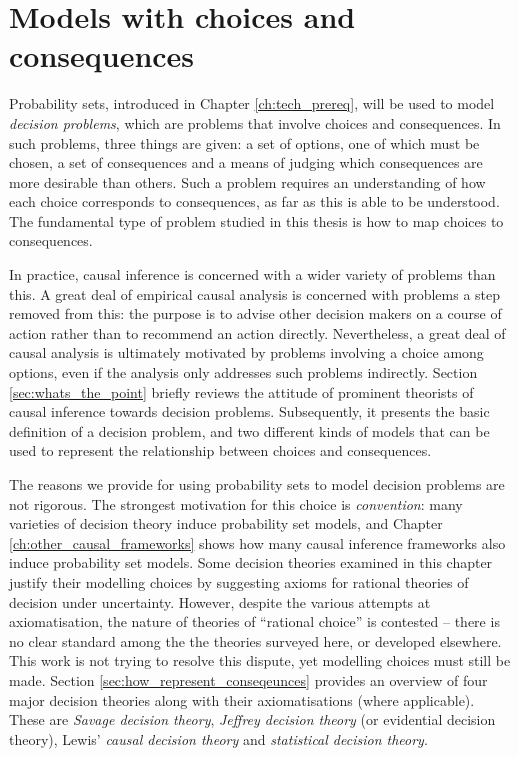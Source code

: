 

\chapter{Models with choices and consequences}\label{ch:2p_statmodels}

Probability sets, introduced in Chapter \ref{ch:tech_prereq}, will be used to model \emph{decision problems}, which are problems that involve choices and consequences. In such problems, three things are given: a set of options, one of which must be chosen, a set of consequences and a means of judging which consequences are more desirable than others. Such a problem requires an understanding of how each choice corresponds to consequences, as far as this is able to be understood. The fundamental type of problem studied in this thesis is how to map choices to consequences. 

In practice, causal inference is concerned with a wider variety of problems than this. A great deal of empirical causal analysis is concerned with problems a step removed from this: the purpose is to advise other decision makers on a course of action rather than to recommend an action directly. Nevertheless, a great deal of causal analysis is ultimately motivated by problems involving a choice among options, even if the analysis only addresses such problems indirectly. Section \ref{sec:whats_the_point} briefly reviews the attitude of prominent theorists of causal inference towards decision problems. Subsequently, it presents the basic definition of a decision problem, and two different kinds of models that can be used to represent the relationship between choices and consequences.

The reasons we provide for using probability sets to model decision problems are not rigorous. The strongest motivation for this choice is \emph{convention}: many varieties of decision theory induce probability set models, and Chapter \ref{ch:other_causal_frameworks} shows how many causal inference frameworks also induce probability set models. Some decision theories examined in this chapter justify their modelling choices by suggesting axioms for rational theories of decision under uncertainty. However, despite the various attempts at axiomatisation, the nature of theories of ``rational choice'' is contested -- there is no clear standard among the the theories surveyed here, or developed elsewhere. This work is not trying to resolve this dispute, yet modelling choices must still be made. Section \ref{sec:how_represent_conseqeunces} provides an overview of four major decision theories along with their axiomatisations (where applicable). These are \emph{Savage decision theory}, \emph{Jeffrey decision theory} (or evidential decision theory), Lewis' \emph{causal decision theory} and \emph{statistical decision theory}.

